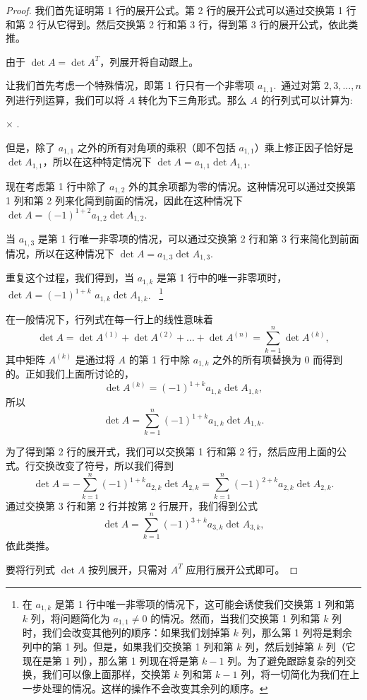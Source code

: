 \begin{proof} 我们首先证明第 1 行的展开公式。第 2 行的展开公式可以通过交换第 1 行和第 2 行从它得到。然后交换第 2 行和第 3 行，得到第 3 行的展开公式，依此类推。

由于 $\det A = \det A^T$，列展开将自动跟上。

让我们首先考虑一个特殊情况，即第 1 行只有一个非零项 $a_{1,1}$.~通过对第 $2,3,...,n$ 列进行列运算，我们可以将 $A$ 转化为下三角形式。那么 $A$ 的行列式可以计算为:

 $\times$ .

但是，除了 $a_{1,1}$ 之外的所有对角项的乘积（即不包括 $a_{1,1}$）乘上修正因子恰好是 $\det A_{1,1}$，所以在这种特定情况下 $\det A = a_{1,1} \det A_{1,1}$.~

现在考虑第 1 行中除了 $a_{1,2}$ 外的其余项都为零的情况。这种情况可以通过交换第 1 列和第 2 列来化简到前面的情况，因此在这种情况下 $\det A = (-1)^{1+2} a_{1,2} \det A_{1,2}$.~

当 $a_{1,3}$ 是第 1 行唯一非零项的情况，可以通过交换第 2 行和第 3 行来简化到前面情况，所以在这种情况下 $\det A = a_{1,3} \det A_{1,3}$.~

重复这个过程，我们得到，当 $a_{1,k}$ 是第 1 行中的唯一非零项时，$\det A = (-1)^{1+k} $ $a_{1,k} \det A_{1,k}$.~
\footnote{
在 $a_{1,k}$ 是第 1 行中唯一非零项的情况下，这可能会诱使我们交换第 1 列和第 $k$ 列，将问题简化为 $a_{1,1} \neq 0$ 的情况。然而，当我们交换第 1 列和第 $k$ 列时，我们会改变其他列的顺序：如果我们划掉第 $k$ 列，那么第 1 列将是剩余列中的第 1 列。但是，如果我们交换第 1 列和第 $k$ 列，然后划掉第 $k$ 列（它现在是第 1 列），那么第 1 列现在将是第 $k-1$ 列。为了避免跟踪复杂的列交换，我们可以像上面那样，交换第 $k$ 列和第 $k-1$ 列，将一切简化为我们在上一步处理的情况。这样的操作不会改变其余列的顺序。
}

在一般情况下，行列式在每一行上的线性意味着
$$\det A = \det A^{(1)} + \det A^{(2)} + \dots + \det A^{(n)} = \sum_{k=1}^n \det A^{(k)},$$
其中矩阵 $A^{(k)}$ 是通过将 $A$ 的第 1 行中除 $a_{1,k}$ 之外的所有项替换为 0 而得到的。正如我们上面所讨论的，
$$\det A^{(k)} = (-1)^{1+k} a_{1,k} \det A_{1,k},$$
所以
$$\det A = \sum_{k=1}^n (-1)^{1+k} a_{1,k} \det A_{1,k}.$$

为了得到第 2 行的展开式，我们可以交换第 1 行和第 2 行，然后应用上面的公式。行交换改变了符号，所以我们得到 $$\det A = -\sum_{k=1}^n (-1)^{1+k} a_{2,k} \det A_{2,k} = \sum_{k=1}^n (-1)^{2+k} a_{2,k} \det A_{2,k}.$$
通过交换第 3 行和第 2 行并按第 2 行展开，我们得到公式
$$\det A = \sum_{k=1}^n (-1)^{3+k} a_{3,k} \det A_{3,k},$$
依此类推。

要将行列式 $\det A$ 按列展开，只需对 $A^T$ 应用行展开公式即可。\end{proof}

